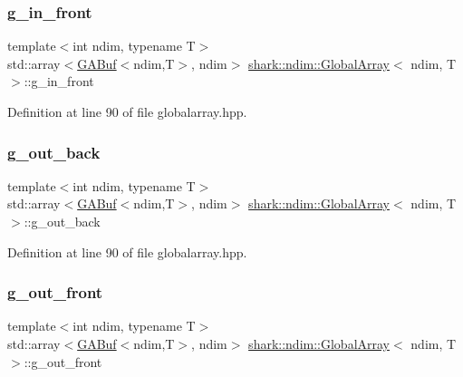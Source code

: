 \subsubsection{\texorpdfstring{g\+\_\+in\+\_\+front}{g\_in\_front}}
{\footnotesize\ttfamily template$<$int ndim, typename T$>$ \\
std\+::array$<$\hyperlink{classshark_1_1ndim_1_1_g_a_buf}{G\+A\+Buf}$<$ndim,T$>$, ndim$>$ \hyperlink{classshark_1_1ndim_1_1_global_array}{shark\+::ndim\+::\+Global\+Array}$<$ ndim, T $>$\+::g\+\_\+in\+\_\+front}



Definition at line 90 of file globalarray.\+hpp.

\hypertarget{classshark_1_1ndim_1_1_global_array_a1f7c189d498d7e7c1c79d9a613d1c5a9}{}\label{classshark_1_1ndim_1_1_global_array_a1f7c189d498d7e7c1c79d9a613d1c5a9} 
\subsubsection{\texorpdfstring{g\+\_\+out\+\_\+back}{g\_out\_back}}
{\footnotesize\ttfamily template$<$int ndim, typename T$>$ \\
std\+::array$<$\hyperlink{classshark_1_1ndim_1_1_g_a_buf}{G\+A\+Buf}$<$ndim,T$>$, ndim$>$ \hyperlink{classshark_1_1ndim_1_1_global_array}{shark\+::ndim\+::\+Global\+Array}$<$ ndim, T $>$\+::g\+\_\+out\+\_\+back}



Definition at line 90 of file globalarray.\+hpp.

\hypertarget{classshark_1_1ndim_1_1_global_array_ad811cd36846992d5671148e7da49bb04}{}\label{classshark_1_1ndim_1_1_global_array_ad811cd36846992d5671148e7da49bb04} 
\subsubsection{\texorpdfstring{g\+\_\+out\+\_\+front}{g\_out\_front}}
{\footnotesize\ttfamily template$<$int ndim, typename T$>$ \\
std\+::array$<$\hyperlink{classshark_1_1ndim_1_1_g_a_buf}{G\+A\+Buf}$<$ndim,T$>$, ndim$>$ \hyperlink{classshark_1_1ndim_1_1_global_array}{shark\+::ndim\+::\+Global\+Array}$<$ ndim, T $>$\+::g\+\_\+out\+\_\+front}



